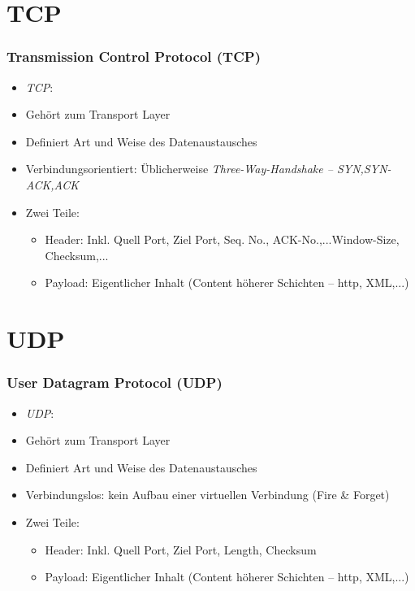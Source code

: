 \documentclass[xcolor=dvipsnames, aspectratio=169]{beamer}
\begin{document}
\section{TCP}
\begin{frame}
	\frametitle{Transmission Control Protocol (TCP)}
	\begin{itemize}
		\item \emph{TCP}: 
		\item Gehört zum Transport Layer
		\item Definiert Art und Weise des Datenaustausches
		\item Verbindungsorientiert: Üblicherweise \emph{Three-Way-Handshake -- SYN,SYN-ACK,ACK}
		\item Zwei Teile:
		\begin{itemize}
			\item Header: Inkl. Quell Port, Ziel Port, Seq. No., ACK-No.,...Window-Size, Checksum,...
			\item Payload: Eigentlicher Inhalt (Content höherer Schichten -- http, XML,...)
		\end{itemize}
	\end{itemize}
\end{frame}

\section{UDP}
\begin{frame}
	\frametitle{User Datagram Protocol (UDP)}
	\begin{itemize}
		\item \emph{UDP}: 
		\item Gehört zum Transport Layer
		\item Definiert Art und Weise des Datenaustausches
		\item Verbindungslos: kein Aufbau einer virtuellen Verbindung (\glqq Fire \& Forget\grqq)
		\item Zwei Teile:
		\begin{itemize}
			\item Header: Inkl. Quell Port, Ziel Port, Length, Checksum
			\item Payload: Eigentlicher Inhalt (Content höherer Schichten -- http, XML,...)
		\end{itemize}
	\end{itemize}
\end{frame}
\end{document}
